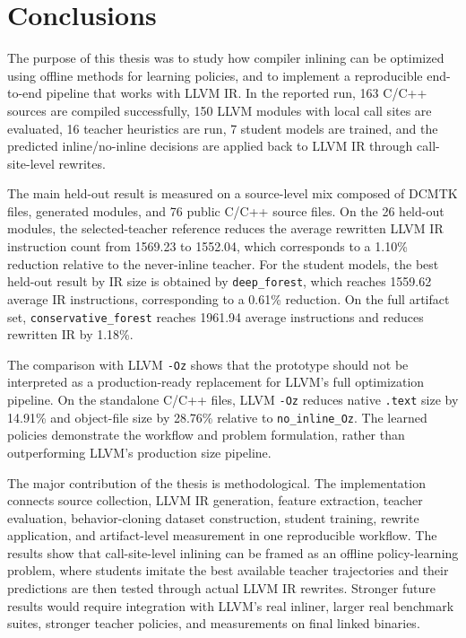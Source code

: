 \documentclass[12pt, a4paper]{report}
\begin{document}

\chapter{Conclusions}

\begingroup
\small
The purpose of this thesis was to study how compiler inlining can be optimized
using offline methods for learning policies, and to implement a reproducible
end-to-end pipeline that works with LLVM IR. In the reported run, 163 C/C++
sources are compiled successfully, 150 LLVM modules with local call sites are
evaluated, 16 teacher heuristics are run, 7 student models are trained, and the
predicted inline/no-inline decisions are applied back to LLVM IR through
call-site-level rewrites.

The main held-out result is measured on a source-level mix composed of DCMTK
files, generated modules, and 76 public C/C++ source files. On the 26 held-out
modules, the selected-teacher reference reduces the average rewritten LLVM IR
instruction count from 1569.23 to 1552.04, which corresponds to a 1.10\%
reduction relative to the never-inline teacher. For the student models, the
best held-out result by IR size is obtained by \texttt{deep\_forest}, which
reaches 1559.62 average IR instructions, corresponding to a 0.61\% reduction.
On the full artifact set, \texttt{conservative\_forest} reaches 1961.94 average
instructions and reduces rewritten IR by 1.18\%.

The comparison with LLVM \texttt{-Oz} shows that the prototype should not be
interpreted as a production-ready replacement for LLVM's full optimization
pipeline. On the standalone C/C++ files, LLVM \texttt{-Oz} reduces native
\texttt{.text} size by 14.91\% and object-file size by 28.76\% relative to
\texttt{no\_inline\_Oz}. The learned policies demonstrate the workflow and
problem formulation, rather than outperforming LLVM's production size pipeline.

The major contribution of the thesis is methodological. The implementation
connects source collection, LLVM IR generation, feature extraction, teacher
evaluation, behavior-cloning dataset construction, student training, rewrite
application, and artifact-level measurement in one reproducible workflow. The
results show that call-site-level inlining can be framed as an offline
policy-learning problem, where students imitate the best available teacher
trajectories and their predictions are then tested through actual LLVM IR
rewrites. Stronger future results would require integration with LLVM's real
inliner, larger real benchmark suites, stronger teacher policies, and
measurements on final linked binaries.
\endgroup
\end{document}

